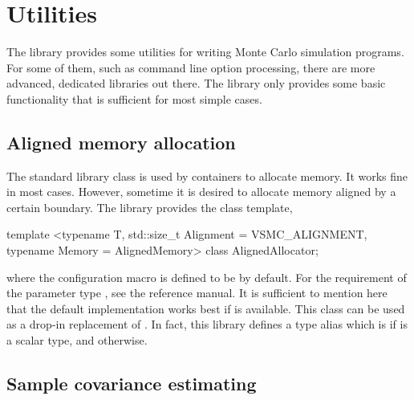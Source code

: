 \chapter{Utilities}
\label{chap:Utilities}

The library provides some utilities for writing Monte Carlo simulation
programs. For some of them, such as command line option processing, there are
more advanced, dedicated libraries out there. The library only provides some
basic functionality that is sufficient for most simple cases.

\section{Aligned memory allocation}
\label{sec:Aligned memory allocation}

The standard library class  is used by containers to
allocate memory. It works fine in most cases. However, sometime it is desired
to allocate memory aligned by a certain boundary. The library provides the
class template,
\begin{cppcode}
  template <typename T, std::size_t Alignment = VSMC_ALIGNMENT,
      typename Memory = AlignedMemory>
  class AlignedAllocator;
\end{cppcode}
where the configuration macro  is defined to be
 by default. For the requirement of the parameter type
, see the reference manual. It is sufficient to mention here
that the default implementation works best if \tbb is available. This class can
be used as a drop-in replacement of . In fact,
this library defines a type alias  which is
 if  is a scalar
type, and  otherwise.

\section{Sample covariance estimating}
\label{sec:Sample covariance estimating}

